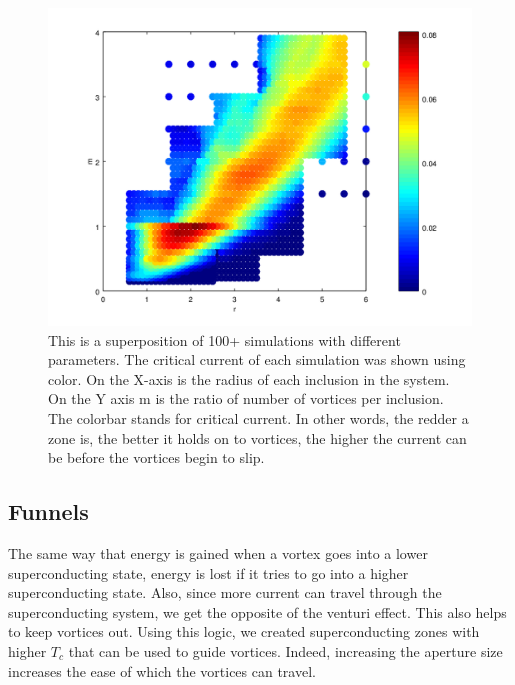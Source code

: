 \begin{figure}[htbp]
\begin{center}
\includegraphics[scale=.50]{HDFinal.png}
\caption{ This is a superposition of 100+ simulations with different parameters. The critical current of each simulation was shown using color. On the X-axis is the radius of each inclusion in the system. On the Y axis m is the ratio of number of vortices per inclusion. The colorbar stands for critical current. In other words, the redder a zone is, the better it holds on to vortices, the higher the current can be before the vortices begin to slip.}
\label{HDF}
\end{center}
\end{figure}

\subsection{Funnels}
The same way that energy is gained when a vortex goes into a lower superconducting state, energy is lost if it tries to go into a higher superconducting state. Also, since more current can travel through the superconducting system, we get the opposite of the venturi effect. This also helps to keep vortices out. Using this logic, we created superconducting zones with higher $T_c$ that can be used to guide vortices. Indeed, increasing the aperture size increases the ease of which the vortices can travel.

